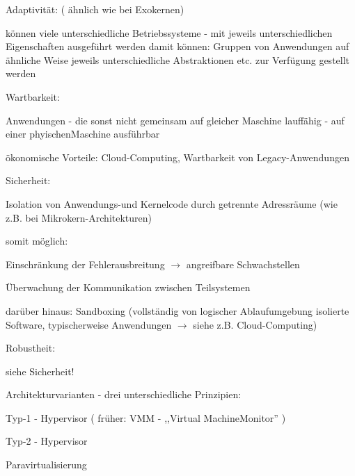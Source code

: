 \documentclass[a4paper]{article}
\begin{document}
\begin{multicols}{3}
    \begin{itemize*}
        \item
        Adaptivität: ( ähnlich wie bei Exokernen)
        \begin{itemize*}
            \item können viele unterschiedliche Betriebssysteme - mit jeweils unterschiedlichen Eigenschaften ausgeführt werden damit können: Gruppen von Anwendungen auf ähnliche Weise jeweils unterschiedliche Abstraktionen etc. zur Verfügung gestellt werden
        \end{itemize*}
        \item
        Wartbarkeit:
        \begin{itemize*}
            \item Anwendungen - die sonst nicht gemeinsam auf gleicher Maschine lauffähig - auf einer phyischenMaschine ausführbar
            \item ökonomische Vorteile: Cloud-Computing, Wartbarkeit von Legacy-Anwendungen
        \end{itemize*}
        \item
        Sicherheit:
        \begin{itemize*}
            \item Isolation von Anwendungs-und Kernelcode durch getrennte Adressräume (wie z.B. bei Mikrokern-Architekturen)
            \item somit möglich: \begin{enumerate*} \item Einschränkung der Fehlerausbreitung $\rightarrow$ angreifbare Schwachstellen \item Überwachung der Kommunikation zwischen Teilsystemen \end{enumerate*}
            \item darüber hinaus: Sandboxing (vollständig von logischer Ablaufumgebung isolierte Software, typischerweise Anwendungen $\rightarrow$ siehe z.B. Cloud-Computing)
        \end{itemize*}
        \item
        Robustheit:
        \begin{itemize*}
            \item siehe Sicherheit!
        \end{itemize*}
    \end{itemize*}

    Architekturvarianten - drei unterschiedliche Prinzipien:

    \begin{enumerate*}
        \item
        Typ-1 - Hypervisor ( früher: VMM - ,,Virtual MachineMonitor'' )
        \item
        Typ-2 - Hypervisor
        \item
        Paravirtualisierung
    \end{enumerate*}



\end{multicols}
\end{document}
